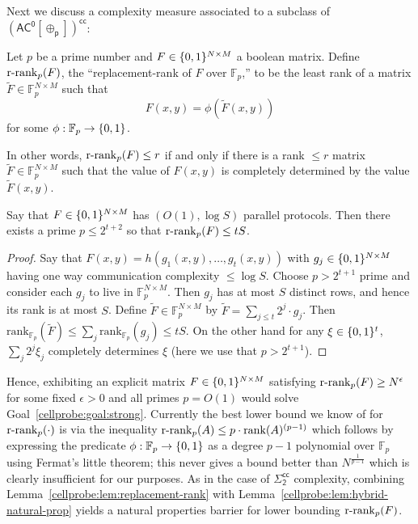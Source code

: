 Next we discuss a complexity measure associated to a subclass of $\mathsf{(AC^0[\oplus_p])^{cc}}$:
\begin{definition}
Let $p$ be a prime number and $F \in \{0,1\}^{N \times M}$ a boolean matrix. Define $\mathrm{r}\text{-}\mathrm{rank}_{p}(F)$, the ``replacement-rank of $F$ over $\mathbb{F}_p$,'' to be the least rank of a matrix $\tilde{F} \in \mathbb{F}_p^{N \times M}$ such that
\[
F(x,y) = \phi(\tilde{F}(x,y))
\]
for some $\phi: \mathbb{F}_p \to \{0,1\}$. 
\end{definition}
In other words, $\mathrm{r}\text{-}\mathrm{rank}_{p}(F)\leq r$ if and only if there is a rank $\leq r$ matrix $\tilde{F} \in \mathbb{F}_p^{N \times M}$ such that the value of $F(x,y)$ is completely determined by the value $\tilde{F}(x,y)$.
\begin{lemma}\label{cellprobe:lem:replacement-rank}
Say that $F \in \{0,1\}^{N \times M}$ has $(O(1), \log S)$ parallel protocols. Then there exists a prime $p \leq 2^{t+2}$ so that $\mathrm{r}\text{-}\mathrm{rank}_p(F) \leq tS$. 
\end{lemma}
\begin{proof}
Say that $F(x,y) = h(g_1(x,y),\ldots,g_t(x,y))$ with $g_j\in \{0,1\}^{N \times M}$ having one way communication complexity $\leq \log S$. Choose $p > 2^{t+1}$ prime and consider each $g_j$ to live in $\mathbb{F}_p^{N \times M}$. Then $g_j$ has at most $S$ distinct rows, and hence its rank is at most $S$. Define $\tilde{F} \in \mathbb{F}_p^{N \times M}$ by $\tilde{F} = \sum_{j \leq t} 2^j \cdot g_j$.
Then $\mathrm{rank}_{\mathbb{F}_p}(\tilde{F}) \leq \sum_j \mathrm{rank}_{\mathbb{F}_p}(g_j) \leq tS$. On the other hand for any $\xi \in \{0,1\}^t$, $\sum_j 2^j \xi_j$ completely determines $\xi$ (here we use that $p > 2^{t+1}$).
\end{proof}
Hence, exhibiting an explicit matrix $F \in \{0,1\}^{N \times M}$ satisfying $\mathrm{r}\text{-}\mathrm{rank}_p(F) \geq N^{\epsilon}$ for some fixed $\epsilon>0$ and all primes $p =O(1)$ would solve Goal~\ref{cellprobe:goal:strong}. Currently the best lower bound we know of for $\mathrm{r}\text{-}\mathrm{rank}_p(\cdot)$ is via the inequality $\mathrm{r}\text{-}\mathrm{rank}_p(A) \leq p\cdot \mathrm{rank}(A)^{(p-1)}$ which follows by expressing the predicate $\phi: \mathbb{F}_p \to \{0,1\}$ as a degree $p-1$ polynomial over $\mathbb{F}_p$ using Fermat's little theorem; this never gives a bound better than $N^{\frac{1}{p-1}}$ which is clearly insufficient for our purposes. 
As in the case of $\mathsf{\Sigma_2^{cc}}$ complexity, combining Lemma~\ref{cellprobe:lem:replacement-rank} with Lemma~\ref{cellprobe:lem:hybrid-natural-prop} yields a natural properties barrier for lower bounding $\mathrm{r}\text{-}\mathrm{rank}_p(F)$.

